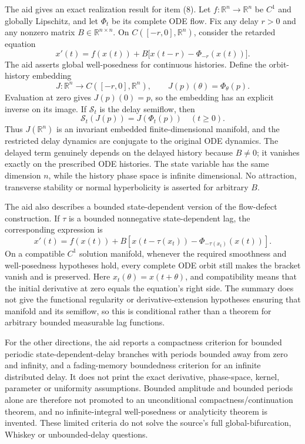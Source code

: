 \documentclass[11pt]{article}
\newcommand{\R}{\mathbb{R}}
\begin{document}
The aid gives an exact realization result for item (8). Let \(f:\R^n\to\R^n\) be \(C^1\) and globally Lipschitz, and let \(\Phi_t\) be its complete ODE flow. Fix any delay \(r>0\) and any nonzero matrix \(B\in\R^{n\times n}\). On \(C([-r,0],\R^n)\), consider the retarded equation
\[
x'(t)=f(x(t))+B\bigl[x(t-r)-\Phi_{-r}(x(t))\bigr].
\]
The aid asserts global well-posedness for continuous histories. Define the orbit-history embedding
\[
J:\R^n\to C([-r,0],\R^n),\qquad J(p)(\theta)=\Phi_\theta(p).
\]
Evaluation at zero gives \(J(p)(0)=p\), so the embedding has an explicit inverse on its image. If \(\mathcal S_t\) is the delay semiflow, then
\[
\mathcal S_t(J(p))=J(\Phi_t(p))\quad(t\ge0).
\]
Thus \(J(\R^n)\) is an invariant embedded finite-dimensional manifold, and the restricted delay dynamics are conjugate to the original ODE dynamics. The delayed term genuinely depends on the delayed history because \(B\ne0\); it vanishes exactly on the prescribed ODE histories. The state variable has the same dimension \(n\), while the history phase space is infinite dimensional. No attraction, transverse stability or normal hyperbolicity is asserted for arbitrary \(B\).

The aid also describes a bounded state-dependent version of the flow-defect construction. If \(\tau\) is a bounded nonnegative state-dependent lag, the corresponding expression is
\[
x'(t)=f(x(t))+B\left[x(t-\tau(x_t))-\Phi_{-\tau(x_t)}(x(t))\right].
\]
On a compatible \(C^1\) solution manifold, whenever the required smoothness and well-posedness hypotheses hold, every complete ODE orbit still makes the bracket vanish and is preserved. Here \(x_t(\theta)=x(t+\theta)\), and compatibility means that the initial derivative at zero equals the equation's right side. The summary does not give the functional regularity or derivative-extension hypotheses ensuring that manifold and its semiflow, so this is conditional rather than a theorem for arbitrary bounded measurable lag functions.

For the other directions, the aid reports a compactness criterion for bounded periodic state-dependent-delay branches with periods bounded away from zero and infinity, and a fading-memory boundedness criterion for an infinite distributed delay. It does not print the exact derivative, phase-space, kernel, parameter or uniformity assumptions. Bounded amplitude and bounded periods alone are therefore not promoted to an unconditional compactness/continuation theorem, and no infinite-integral well-posedness or analyticity theorem is invented. These limited criteria do not solve the source's full global-bifurcation, Whiskey or unbounded-delay questions.
\end{document}
